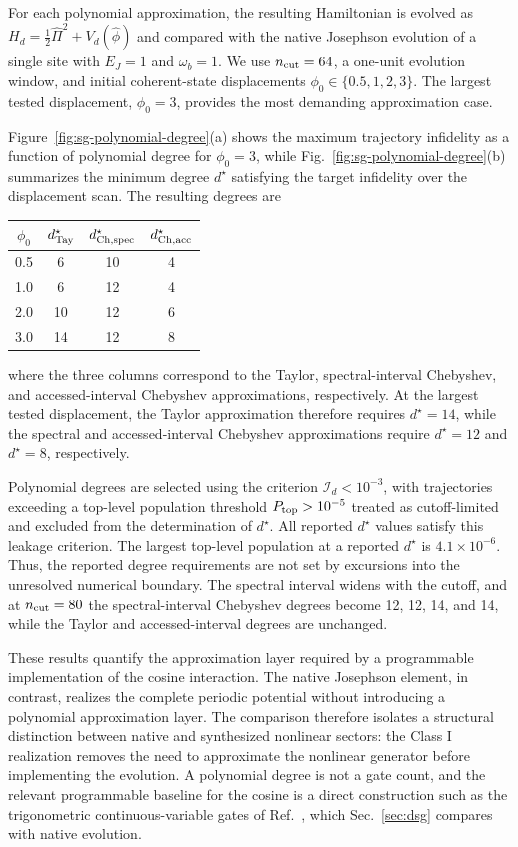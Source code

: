 \documentclass[pra,twocolumn,superscriptaddress,nofootinbib,floatfix]{revtex4-2}
\theoremstyle{remark}
\begin{document}
For each polynomial approximation, the resulting Hamiltonian is evolved as
\(H_d=\frac12\hat\Pi^2+V_d(\hat\phi)\)
and compared with the native Josephson evolution of a single site with \(E_J=1\) and \(\omega_b=1\). We use \(n_{\rm cut}=64\), a one-unit evolution window, and initial coherent-state displacements
\(\phi_0\in\{0.5,1,2,3\}.\)
The largest tested displacement, \(\phi_0=3\), provides the most demanding approximation case.

Figure~\ref{fig:sg-polynomial-degree}(a) shows the maximum trajectory infidelity as a function of polynomial degree for \(\phi_0=3\), while Fig.~\ref{fig:sg-polynomial-degree}(b) summarizes the minimum degree \(d^\star\) satisfying the target infidelity over the displacement scan. The resulting degrees are
\begin{center}
\begin{tabular}{c|ccc}
\(\phi_0\) & \(d_{\rm Tay}^{\star}\) & \(d_{\rm Ch,spec}^{\star}\) & \(d_{\rm Ch,acc}^{\star}\) \\
\hline
0.5 & 6 & 10 & 4 \\
1.0 & 6 & 12 & 4 \\
2.0 & 10 & 12 & 6 \\
3.0 & 14 & 12 & 8
\end{tabular}
\end{center}
where the three columns correspond to the Taylor, spectral-interval Chebyshev, and accessed-interval Chebyshev approximations, respectively. At the largest tested displacement, the Taylor approximation therefore requires \(d^\star=14\), while the spectral and accessed-interval Chebyshev approximations require \(d^\star=12\) and \(d^\star=8\), respectively.

Polynomial degrees are selected using the criterion \(\mathcal I_d<10^{-3}\), with trajectories exceeding a top-level population threshold \(P_{\rm top}>10^{-5}\) treated as cutoff-limited and excluded from the determination of \(d^\star\). All reported \(d^\star\) values satisfy this leakage criterion. The largest top-level population at a reported \(d^\star\) is \(4.1\times10^{-6}\). Thus, the reported degree requirements are not set by excursions into the unresolved numerical boundary. The spectral interval widens with the cutoff, and at \(n_{\rm cut}=80\) the spectral-interval Chebyshev degrees become 12, 12, 14, and 14, while the Taylor and accessed-interval degrees are unchanged.

These results quantify the approximation layer required by a programmable implementation of the cosine interaction. The native Josephson element, in contrast, realizes the complete periodic potential without introducing a polynomial approximation layer. The comparison therefore isolates a structural distinction between native and synthesized nonlinear sectors: the Class I realization removes the need to approximate the nonlinear generator before implementing the evolution. A polynomial degree is not a gate count, and the relevant programmable baseline for the cosine is a direct construction such as the trigonometric continuous-variable gates of Ref.~\cite{Rainaldi2026TrigonometricCV}, which Sec.~\ref{sec:dsg} compares with native evolution.
\end{document}
